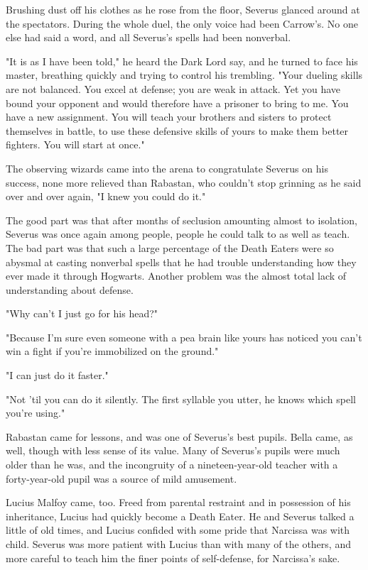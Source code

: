 Brushing dust off his clothes as he rose from the floor, Severus glanced around at the spectators. During the whole duel, the only voice had been Carrow's. No one else had said a word, and all Severus's spells had been nonverbal.

"It is as I have been told," he heard the Dark Lord say, and he turned to face his master, breathing quickly and trying to control his trembling. "Your dueling skills are not balanced. You excel at defense; you are weak in attack. Yet you have bound your opponent and would therefore have a prisoner to bring to me. You have a new assignment. You will teach your brothers and sisters to protect themselves in battle, to use these defensive skills of yours to make them better fighters. You will start at once."

The observing wizards came into the arena to congratulate Severus on his success, none more relieved than Rabastan, who couldn't stop grinning as he said over and over again, "I knew you could do it."

The good part was that after months of seclusion amounting almost to isolation, Severus was once again among people, people he could talk to as well as teach. The bad part was that such a large percentage of the Death Eaters were so abysmal at casting nonverbal spells that he had trouble understanding how they ever made it through Hogwarts. Another problem was the almost total lack of understanding about defense.

"Why can't I just go for his head?"

"Because I'm sure even someone with a pea brain like yours has noticed you can't win a fight if you're immobilized on the ground."

"I can just do it faster."

"Not 'til you can do it silently. The first syllable you utter, he knows which spell you're using."

Rabastan came for lessons, and was one of Severus's best pupils. Bella came, as well, though with less sense of its value. Many of Severus's pupils were much older than he was, and the incongruity of a nineteen-year-old teacher with a forty-year-old pupil was a source of mild amusement.

Lucius Malfoy came, too. Freed from parental restraint and in possession of his inheritance, Lucius had quickly become a Death Eater. He and Severus talked a little of old times, and Lucius confided with some pride that Narcissa was with child. Severus was more patient with Lucius than with many of the others, and more careful to teach him the finer points of self-defense, for Narcissa's sake.

